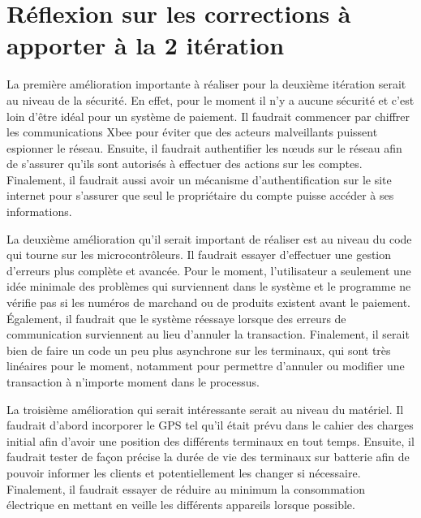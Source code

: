 \section{Réflexion sur les corrections à apporter à la 2\ieme{} itération}
La première amélioration importante à réaliser pour la deuxième itération serait au niveau de la sécurité. En effet, pour le moment il n’y a aucune sécurité et c’est loin d’être idéal pour un système de paiement. Il faudrait commencer par chiffrer les communications Xbee pour éviter que des acteurs malveillants puissent espionner le réseau. Ensuite, il faudrait authentifier les n\oe{}uds sur le réseau afin de s’assurer qu’ils sont autorisés à effectuer des actions sur les comptes. Finalement, il faudrait aussi avoir un mécanisme d’authentification sur le site internet pour s’assurer que seul le propriétaire du compte puisse accéder à ses informations.

La deuxième amélioration qu'il serait important de réaliser est au niveau du code qui tourne sur les microcontrôleurs. Il faudrait essayer d'effectuer une gestion d’erreurs plus complète et avancée. Pour le moment, l’utilisateur a seulement une idée minimale des problèmes qui surviennent dans le système et le programme ne vérifie pas si les numéros de marchand ou de produits existent avant le paiement. Également, il faudrait que le système réessaye lorsque des erreurs de communication surviennent au lieu d'annuler la transaction. Finalement, il serait bien de faire un code un peu plus asynchrone sur les terminaux, qui sont très linéaires pour le moment, notamment pour permettre d’annuler ou modifier une transaction à n’importe moment dans le processus.

La troisième amélioration qui serait intéressante serait au niveau du matériel. Il faudrait d’abord incorporer le GPS tel qu’il était prévu dans le cahier des charges initial afin d’avoir une position des différents terminaux en tout temps. Ensuite, il faudrait tester de façon précise la durée de vie des terminaux sur batterie afin de pouvoir informer les clients et potentiellement les changer si nécessaire. Finalement, il faudrait essayer de réduire au minimum la consommation électrique en mettant en veille les différents appareils lorsque possible.
